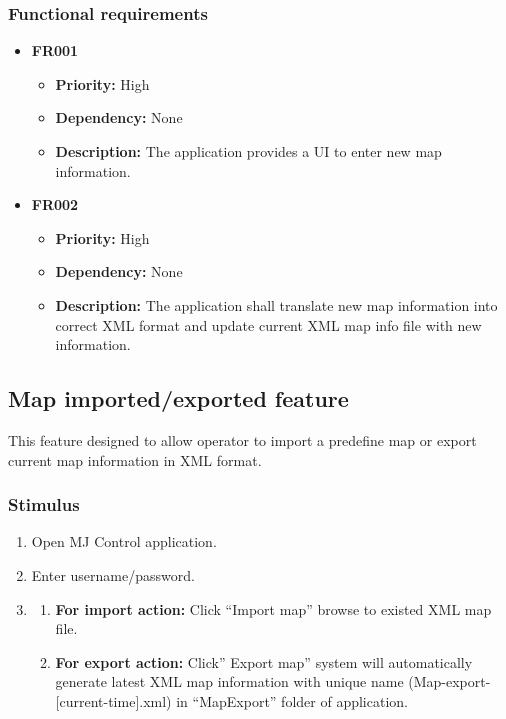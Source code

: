 \documentclass[10pt,a4paper,titlepage]{article}
\begin{document}
	\subsubsection*{Functional requirements}
	\begin{itemize}
		\item \textbf{FR001} 
		\begin{itemize}
			\item \textbf{Priority:} High
			\item \textbf{Dependency:} None
			\item \textbf{Description:} The application provides a UI to enter new map information.
		\end{itemize}
		\item \textbf{FR002}
		\begin{itemize}
			\item \textbf{Priority:} High
			\item \textbf{Dependency:} None
			\item \textbf{Description:} The application shall translate new map information into correct XML format and update current XML map info file with new information.
		\end{itemize}
	\end{itemize}
	
	\subsection{Map imported/exported feature}
	This feature designed to allow operator to import a predefine map or export current map information in XML format.
	
	\subsubsection*{Stimulus}
	\begin{enumerate}
		\item Open MJ Control application.
		\item Enter username/password.
		\item 
		\begin{enumerate} 
			\item \textbf{For import action:} Click “Import map” browse to existed XML map file.
			\item \textbf{For export action:} Click” Export map” system will automatically generate latest XML map information with unique name (Map-export-[current-time].xml) in “MapExport” folder of application.
		\end{enumerate} 
	\end{enumerate}
	
\end{document}
